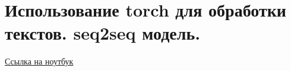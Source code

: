 \section{Использование torch для обработки текстов. seq2seq модель.}

\href{https://github.com/andriygav/School/blob/master/2018/AD/Lecture/Lecture18.ipynb}{Ссылка на ноутбук}
